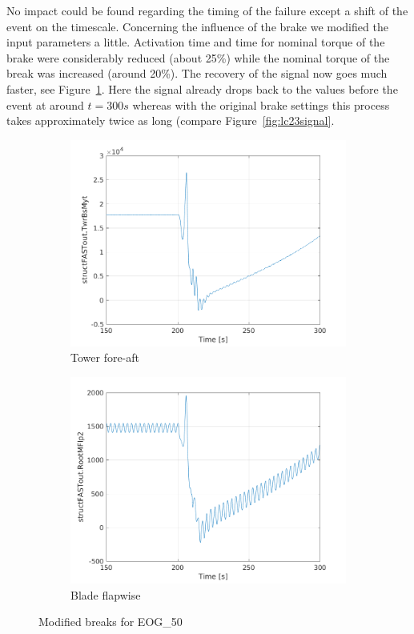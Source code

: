 \documentclass[10pt]{article}
\begin{document}
No impact could be found regarding the timing of the failure except a shift of the event on the timescale.
Concerning the influence of the brake we modified the input parameters a little. Activation time and time for nominal torque of the brake were considerably reduced (about 25\%) while the nominal torque of the break was increased (around 20\%).
The recovery of the signal now goes much faster, see Figure~\ref{fig:lc23breaksignal}. Here the signal already drops back to the values before the event at around $t=300s$ whereas with the original brake settings this process takes approximately twice as long (compare Figure~\ref{fig:lc23signal}.

\begin{figure}[H]
  \centering
\begin{subfigure}{0.40\textwidth}
  \includegraphics[width=1\linewidth]{../CIP_6/FASTextreme/EOG_50_brake/TwrBsMyt.png}
    \caption{Tower fore-aft}
\end{subfigure}
\begin{subfigure}{0.40\textwidth}
  \includegraphics[width=1\linewidth]{../CIP_6/FASTextreme/EOG_50_brake/RootMFlp2.png}
    \caption{Blade flapwise}
\end{subfigure}
\caption{Modified breaks for EOG\_50}
\label{fig:lc23breaksignal}
\end{figure}
\end{document}
